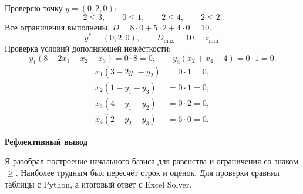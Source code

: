 \documentclass[12pt,a4paper]{article}
\begin{document}
Проверяю точку $y=(0,2,0)$:
\[
2\le3,\qquad 0\le1,\qquad 2\le4,\qquad 2\le2.
\]
Все ограничения выполнены, $D=8\cdot0+5\cdot2+4\cdot0=10$.
\[
\boxed{y^*=(0,2,0),\qquad D_{\max}=10=z_{\min}.}
\]
Проверка условий дополняющей нежёсткости:
\[
y_1(8-2x_1-x_2-x_3)=0\cdot8=0,\qquad
y_3(x_2+x_4-4)=0\cdot1=0.
\]
\[
\begin{aligned}
x_1(3-2y_1-y_2)&=0\cdot1=0,\\
x_2(1-y_1-y_3)&=0\cdot1=0,\\
x_3(4-y_1-y_2)&=0\cdot2=0,\\
x_4(2-y_2-y_3)&=5\cdot0=0.
\end{aligned}
\]

\par\textbf{Рефлективный вывод}

Я разобрал построение начального базиса для равенства и ограничения
со знаком $\ge$. Наиболее трудным был пересчёт строк и оценок.
Для проверки сравнил таблицы с Python, а итоговый ответ с Excel Solver.
\end{document}
